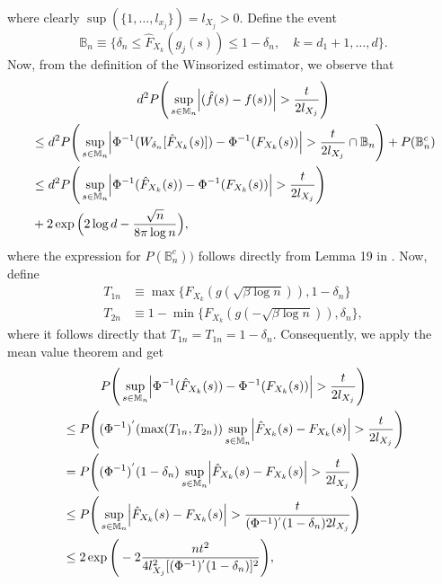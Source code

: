 where clearly $\sup(\{1,\dots,l_{x_j}\}) = l_{X_j} > 0$. Define the event
\begin{equation*}
    \mathbb{B}_n \equiv \{\delta_n \leq \hat{F}_{X_k}(g_j(s)) \leq 1-\delta_n, \quad k = d_1 +1, \dots, d\}.
\end{equation*}
Now, from the definition of the Winsorized estimator, we observe that
\begin{multline*}
    d^2P\Bigg(\sup_{s \in \mathbb{M}_n} \abs{(\hat{f}(s) - f(s))} > \frac{t}{2l_{X_j}}\Bigg) \\
    \begin{aligned}
    &\leq d^2P\Bigg(\sup_{s \in \mathbb{M}_n} \abs{\Phi^{-1}(W_{\delta_n}[\hat{F}_{X_k}(s)]) - \Phi^{-1}(F_{X_k}(s))} > \frac{t}{2l_{X_j}} \cap \mathbb{B}_n\Bigg) + P(\mathbb{B}_n^c) \\
    &\leq d^2P\Bigg(\sup_{s \in \mathbb{M}_n} \abs{\Phi^{-1}(\hat{F}_{X_k}(s)) - \Phi^{-1}(F_{X_k}(s))} > \frac{t}{2l_{X_j}}\Bigg) \\
    &+ 2\exp\Big(2\log d - \frac{\sqrt{n}}{8\pi\log n}\Big),
    \end{aligned}
\end{multline*}
where the expression for $P(\mathbb{B}_n^c))$ follows directly from Lemma 19 in \citet{Liu09}. Now, define 
\begin{align*}
    T_{1n} &\equiv \max\Big\{F_{X_k}(g(\sqrt{\beta\log n})), 1-\delta_n\Big\} \\ T_{2n} &\equiv 1 - \min\Big\{F_{X_k}(g(-\sqrt{\beta\log n})), \delta_n\Big\},
\end{align*}
where it follows directly that $T_{1n} = T_{1n} = 1 - \delta_n$. Consequently, we apply the mean value theorem and get
\begin{multline*}
    P\Bigg(\sup_{s \in \mathbb{M}_n} \abs{\Phi^{-1}(\hat{F}_{X_k}(s)) - \Phi^{-1}(F_{X_k}(s))} > \frac{t}{2l_{X_j}}\Bigg) \\
    \begin{aligned}
    &\leq P\Bigg((\Phi^{-1})^{'}(\max(T_{1n}, T_{2n})) \sup_{s \in \mathbb{M}_n} \abs{\hat{F}_{X_k}(s) - F_{X_k}(s)} > \frac{t}{2l_{X_j}}\Bigg) \\
    &= P\Bigg((\Phi^{-1})^{'}(1-\delta_n) \sup_{s \in \mathbb{M}_n} \abs{\hat{F}_{X_k}(s) - F_{X_k}(s)} > \frac{t}{2l_{X_j}}\Bigg) \\
    &\leq P\Bigg(\sup_{s \in \mathbb{M}_n} \abs{\hat{F}_{X_k}(s) - F_{X_k}(s)} > \frac{t}{(\Phi^{-1})^{'}(1-\delta_n)2l_{X_j}}\Bigg) \\
    &\leq 2\exp\Bigg(-2\frac{nt^2}{4l_{X_j}^2[(\Phi^{-1})^{'}(1-\delta_n)]^2}\Bigg), 
    \end{aligned}
\end{multline*}
